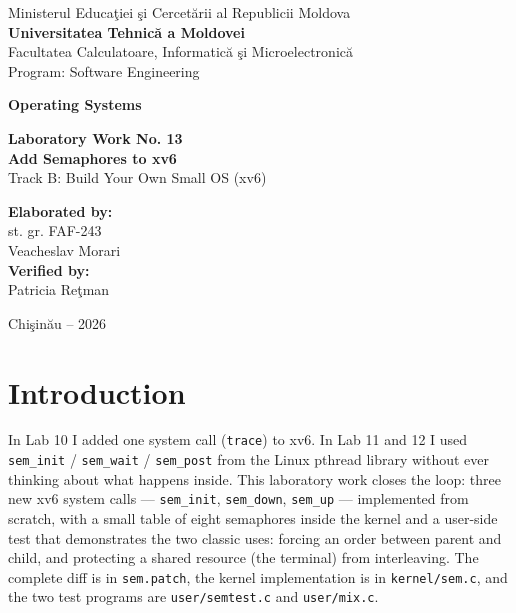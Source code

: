 \documentclass[12pt,a4paper]{article}
\begin{document}
\begin{titlepage}
    \centering
    Ministerul Educa\c{t}iei \c{s}i Cercet\u{a}rii al Republicii Moldova\\[0.4cm]
    \textbf{Universitatea Tehnic\u{a} a Moldovei}\\[0.4cm]
    Facultatea Calculatoare, Informatic\u{a} \c{s}i Microelectronic\u{a}\\[0.2cm]
    Program: Software Engineering

    \vspace{3cm}

    {\LARGE \textbf{Operating Systems}}

    \vspace{1.2cm}

    {\Large \textbf{Laboratory Work No. 13}}\\[0.6cm]
    {\LARGE \textbf{Add Semaphores to xv6}}\\[0.3cm]
    Track B: Build Your Own Small OS (xv6)

    \vspace{3cm}

    \begin{flushright}
        \textbf{Elaborated by:}\\
        st. gr. FAF-243\\
        Veacheslav Morari\\[0.6cm]
        \textbf{Verified by:}\\
        Patricia Re\c{t}man
    \end{flushright}

    \vfill
    Chi\c{s}in\u{a}u -- 2026
\end{titlepage}

\tableofcontents
\newpage

\section*{Introduction}

In Lab 10 I added one system call (\texttt{trace}) to xv6. In Lab 11 and 12 I used \texttt{sem\_init} / \texttt{sem\_wait} / \texttt{sem\_post} from the Linux pthread library without ever thinking about what happens inside. This laboratory work closes the loop: three new xv6 system calls --- \texttt{sem\_init}, \texttt{sem\_down}, \texttt{sem\_up} --- implemented from scratch, with a small table of eight semaphores inside the kernel and a user-side test that demonstrates the two classic uses: forcing an order between parent and child, and protecting a shared resource (the terminal) from interleaving. The complete diff is in \texttt{sem.patch}, the kernel implementation is in \texttt{kernel/sem.c}, and the two test programs are \texttt{user/semtest.c} and \texttt{user/mix.c}.
\end{document}

